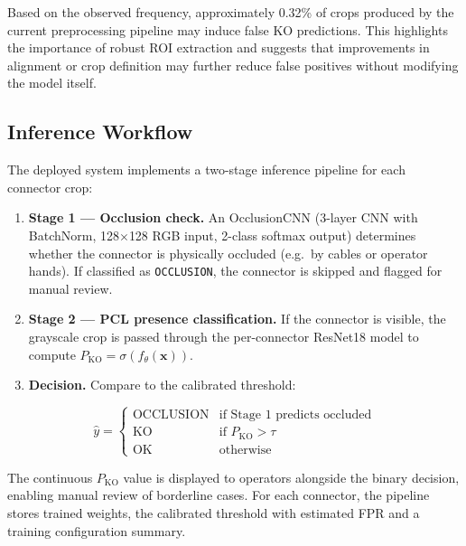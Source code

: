 \documentclass[11pt,a4paper]{article}
\begin{document}
Based on the observed frequency, approximately 0.32\% of crops produced by the current preprocessing pipeline may induce false KO predictions. This highlights the importance of robust ROI extraction and suggests that improvements in alignment or crop definition may further reduce false positives without modifying the model itself.


\subsection{Inference Workflow}

The deployed system implements a two-stage inference pipeline for each connector crop:

\begin{enumerate}[nosep]
    \item \textbf{Stage 1 --- Occlusion check.} An OcclusionCNN (3-layer CNN with BatchNorm, 128$\times$128 RGB input, 2-class softmax output) determines whether the connector is physically occluded (e.g.\ by cables or operator hands). If classified as \texttt{OCCLUSION}, the connector is skipped and flagged for manual review.
    \item \textbf{Stage 2 --- PCL presence classification.} If the connector is visible, the grayscale crop is passed through the per-connector ResNet18 model to compute $P_{\mathrm{KO}} = \sigma(f_\theta(\mathbf{x}))$.
    \item \textbf{Decision.} Compare to the calibrated threshold:
\end{enumerate}
\begin{equation}
    \hat{y} =
    \begin{cases}
    \mathrm{OCCLUSION} & \text{if Stage 1 predicts occluded} \\
    \mathrm{KO} & \text{if } P_{\mathrm{KO}} > \tau \\
    \mathrm{OK} & \text{otherwise}
    \end{cases}
\end{equation}

The continuous $P_{\mathrm{KO}}$ value is displayed to operators alongside the binary decision, enabling manual review of borderline cases. For each connector, the pipeline stores trained weights, the calibrated threshold with estimated FPR  and a training configuration summary.






\end{document}
